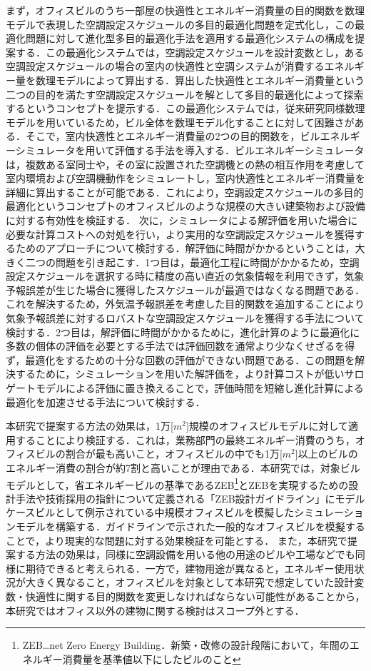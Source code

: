 まず，オフィスビルのうち一部屋の快適性とエネルギー消費量の目的関数を数理モデルで表現した空調設定スケジュールの多目的最適化問題を定式化し，この最適化問題に対して進化型多目的最適化手法を適用する最適化システムの構成を提案する．この最適化システムでは，空調設定スケジュールを設計変数とし，ある空調設定スケジュールの場合の室内の快適性と空調システムが消費するエネルギー量を数理モデルによって算出する．算出した快適性とエネルギー消費量という二つの目的を満たす空調設定スケジュールを解として多目的最適化によって探索するというコンセプトを提示する．この最適化システムでは，従来研究同様数理モデルを用いているため，ビル全体を数理モデル化することに対して困難さがある．そこで，室内快適性とエネルギー消費量の2つの目的関数を，ビルエネルギーシミュレータを用いて評価する手法を導入する．ビルエネルギーシミュレータは，複数ある室同士や，その室に設置された空調機との熱の相互作用を考慮して室内環境および空調機動作をシミュレートし，室内快適性とエネルギー消費量を詳細に算出することが可能である．これにより，空調設定スケジュールの多目的最適化というコンセプトのオフィスビルのような規模の大きい建築物および設備に対する有効性を検証する．
次に，シミュレータによる解評価を用いた場合に必要な計算コストへの対処を行い，より実用的な空調設定スケジュールを獲得するためのアプローチについて検討する．解評価に時間がかかるということは，大きく二つの問題を引き起こす．1つ目は，最適化工程に時間がかかるため，空調設定スケジュールを選択する時に精度の高い直近の気象情報を利用できず，気象予報誤差が生じた場合に獲得したスケジュールが最適ではなくなる問題である．これを解決するため，外気温予報誤差を考慮した目的関数を追加することにより気象予報誤差に対するロバストな空調設定スケジュールを獲得する手法について検討する．2つ目は，解評価に時間がかかるために，進化計算のように最適化に多数の個体の評価を必要とする手法では評価回数を通常より少なくせざるを得ず，最適化をするための十分な回数の評価ができない問題である．この問題を解決するために，シミュレーションを用いた解評価を，より計算コストが低いサロゲートモデルによる評価に置き換えることで，評価時間を短縮し進化計算による最適化を加速させる手法について検討する．

本研究で提案する方法の効果は，1万[$m^2$]規模のオフィスビルモデルに対して適用することにより検証する．これは，業務部門の最終エネルギー消費のうち，オフィスビルの割合が最も高いこと\cite{EDMC15}，オフィスビルの中でも1万[$m^2$]以上のビルのエネルギー消費の割合が約7割と高いことが理由である\cite{BEMA20,EDMC15,Fudoken19}．本研究では，対象ビルモデルとして，省エネルギービルの基準であるZEB\footnote{ZEB…net Zero Energy Building．新築・改修の設計段階において，年間のエネルギー消費量を基準値以下にしたビルのこと}とZEBを実現するための設計手法や技術採用の指針について定義される「ZEB設計ガイドライン」にモデルケースビルとして例示されている中規模オフィスビル\cite{ZEB18}を模擬したシミュレーションモデルを構築する．ガイドラインで示された一般的なオフィスビルを模擬することで，より現実的な問題に対する効果検証を可能とする．
また，本研究で提案する方法の効果は，同様に空調設備を用いる他の用途のビルや工場などでも同様に期待できると考えられる．一方で，建物用途が異なると，エネルギー使用状況が大きく異なること\cite{Kanto11}，オフィスビルを対象として本研究で想定していた設計変数・快適性に関する目的関数を変更しなければならない可能性があることから，本研究ではオフィス以外の建物に関する検討はスコープ外とする．

